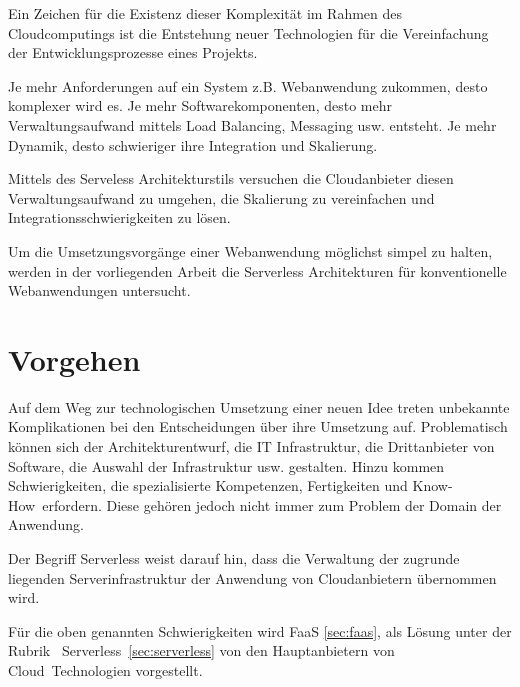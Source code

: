 \documentclass[
12pt,
english,
ngerman,
headsepline,
twoside,
openright,
numbers=noenddot,version=first
]{scrreprt}
\begin{document}


Ein Zeichen für die Existenz dieser Komplexität im Rahmen des Cloudcomputings ist die Entstehung neuer Technologien für die Vereinfachung der Entwicklungsprozesse eines Projekts. 

Je mehr Anforderungen auf ein System z.B. Webanwendung zukommen, desto komplexer wird es. Je mehr Softwarekomponenten, desto mehr Verwaltungsaufwand mittels Load Balancing, Messaging usw. entsteht. Je mehr Dynamik, desto schwieriger ihre Integration und Skalierung.\cite{patternIntegrationEnterprise} 

Mittels des Serveless Architekturstils versuchen die Cloudanbieter diesen Verwaltungsaufwand zu umgehen, die Skalierung zu vereinfachen und Integrationsschwierigkeiten zu lösen.


Um die Umsetzungsvorgänge einer Webanwendung möglichst simpel zu halten, werden in der vorliegenden Arbeit die Serverless Architekturen für konventionelle Webanwendungen untersucht.


\section{Vorgehen}
Auf dem Weg zur technologischen Umsetzung einer neuen Idee treten unbekannte Komplikationen
bei den Entscheidungen über ihre Umsetzung auf. Problematisch können sich der Architekturentwurf, die IT Infrastruktur, die Drittanbieter von Software, die Auswahl der Infrastruktur usw. gestalten. Hinzu kommen Schwierigkeiten, die spezialisierte Kompetenzen, Fertigkeiten und \glqq Know-How\grqq\ erfordern. Diese gehören jedoch nicht immer zum Problem der Domain der Anwendung.

Der Begriff Serverless weist darauf hin, dass die Verwaltung der zugrunde liegenden Serverinfrastruktur der Anwendung von Cloudanbietern übernommen wird. 

Für die oben genannten Schwierigkeiten wird \acrfull{FaaS} \autoref{sec:faas}, als Lösung unter der Rubrik \glqq\ Serverless\grqq\ \autoref{sec:serverless} von den Hauptanbietern von \glqq Cloud\grqq\ Technologien vorgestellt.
\end{document}
